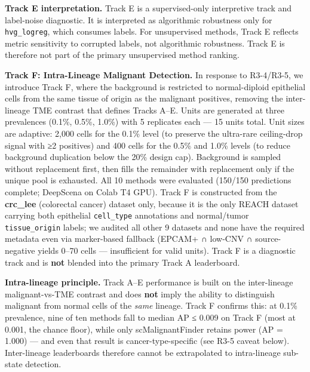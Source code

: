 \documentclass[10pt]{article}
\providecommand{\DIFaddtex}[1]{{\protect\color{trackgreen}#1}} %
\providecommand{\DIFaddFL}[1]{\DIFadd{#1}} %
\providecommand{\DIFadd}[1]{\texorpdfstring{\DIFaddtex{#1}}{#1}} %
\begin{document}
\textbf{\DIFaddFL{Track E interpretation.}} \DIFaddFL{Track E is a supervised-only
interpretive track and label-noise diagnostic. It is interpreted as
algorithmic robustness only for }\texttt{\DIFaddFL{hvg\_logreg}}\DIFaddFL{, which consumes
labels. For unsupervised methods, Track E reflects metric sensitivity to
corrupted labels, not algorithmic robustness. Track E is therefore not
part of the primary unsupervised method ranking.
}

\textbf{\DIFaddFL{Track F: Intra-Lineage Malignant Detection.}} \DIFaddFL{In response to
R3-4/R3-5, we introduce Track F, where the background is restricted to
normal-diploid epithelial cells from the same tissue of origin as the
malignant positives, removing the inter-lineage TME contrast that
defines Tracks A--E. Units are generated at three prevalences (0.1\%,
0.5\%, 1.0\%) with 5 replicates each --- 15 units total. Unit sizes are
adaptive: 2,000 cells for the 0.1\% level (to preserve the ultra-rare
ceiling-drop signal with ≥2 positives) and 400 cells for the 0.5\% and
1.0\% levels (to reduce background duplication below the 20\% design
cap). Background is sampled without replacement first, then fills the
remainder with replacement only if the unique pool is exhausted. All 10
methods were evaluated (150/150 predictions complete; DeepScena on Colab
T4 GPU). Track F is constructed from the }\textbf{\DIFaddFL{crc\_lee}} \DIFaddFL{(colorectal
cancer) dataset only, because it is the only REACH dataset carrying both
epithelial }\texttt{\DIFaddFL{cell\_type}} \DIFaddFL{annotations and normal/tumor
}\texttt{\DIFaddFL{tissue\_origin}} \DIFaddFL{labels; we audited all other 9 datasets and none
have the required metadata even via marker-based fallback (EPCAM+ ∩
low-CNV ∩ source-negative yields 0--70 cells --- insufficient for valid
units). Track F is a diagnostic track and is }\textbf{\DIFaddFL{not}} \DIFaddFL{blended into
the primary Track A leaderboard.
}

\textbf{\DIFaddFL{Intra-lineage principle.}} \DIFaddFL{Track A--E performance is built on the
inter-lineage malignant-vs-TME contrast and does }\textbf{\DIFaddFL{not}} \DIFaddFL{imply the
ability to distinguish malignant from normal cells of the }\emph{\DIFaddFL{same}}
\DIFaddFL{lineage. Track F confirms this: at 0.1\% prevalence, nine of ten methods
fall to median AP ≤ 0.009 on Track F (most at 0.001, the chance floor),
while only scMalignantFinder retains power (AP = 1.000) --- and even
that result is cancer-type-specific (see R3-5 caveat below).
Inter-lineage leaderboards therefore cannot be extrapolated to
intra-lineage sub-state detection.
}
\end{document}

